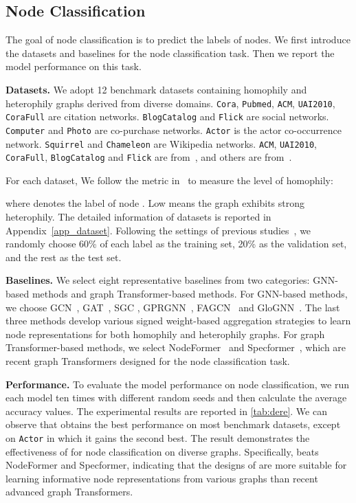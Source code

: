 \documentclass[sigconf, screen]{acmart}
\begin{document}
\subsection{Node Classification}
The goal of node classification is to predict the labels of nodes.
We first introduce the datasets and baselines for the node classification task.
Then we report the model performance on this task.

\textbf{Datasets.} 
We adopt 12 benchmark datasets containing homophily and heterophily graphs derived from diverse domains. 
\texttt{Cora}, \texttt{Pubmed}, \texttt{ACM}, \texttt{UAI2010}, \texttt{CoraFull} are citation networks.
\texttt{BlogCatalog} and \texttt{Flick} are social networks.
\texttt{Computer} and \texttt{Photo} are co-purchase networks.
\texttt{Actor} is the actor co-occurrence network.
\texttt{Squirrel} and \texttt{Chameleon} are Wikipedia networks. 
\texttt{ACM}, \texttt{UAI2010}, \texttt{CoraFull}, \texttt{BlogCatalog} and \texttt{Flick} are from~\cite{amgcn}, and others are from~\cite{gprgnn}.

For each dataset, We follow the metric in~\cite{glognn} to measure the level of homophily:

where  denotes the label of node .
Low  means the graph exhibits strong heterophily.
The detailed information of datasets is reported in Appendix~\ref{app_dataset}.
Following the settings of previous studies~\cite{fagcn,gprgnn,specformer}, we randomly choose 60\% of each label as the training set, 20\% as the validation set, and the rest as the test set.

\textbf{Baselines.}
We select eight representative baselines from two categories: 
GNN-based methods and graph Transformer-based methods.
For GNN-based methods, we choose GCN~\cite{gcn}, GAT~\cite{gat}, SGC \cite{sgc}, GPRGNN~\cite{gprgnn}, FAGCN~\cite{fagcn} and GloGNN~\cite{glognn}.
The last three methods develop various signed weight-based aggregation strategies to learn node representations for both homophily and heterophily graphs.
For graph Transformer-based methods, we select NodeFormer~\cite{nodeformer} and Specformer~\cite{specformer}, which are recent graph Transformers designed for the node classification task.

\textbf{Performance.}
To evaluate the model performance on node classification,
we run each model ten times with different random seeds and then calculate the average accuracy values. 
The experimental results are reported in \autoref{tab:dere}.
We can observe that \name obtains the best performance on most benchmark datasets, except on \texttt{Actor} in which it gains the second best.
The result demonstrates the effectiveness of \name for node classification on diverse graphs. 
Specifically, \name beats NodeFormer and Specformer, indicating that the designs of \name are more suitable for learning informative node representations from various graphs than recent advanced graph Transformers. 
\end{document}
